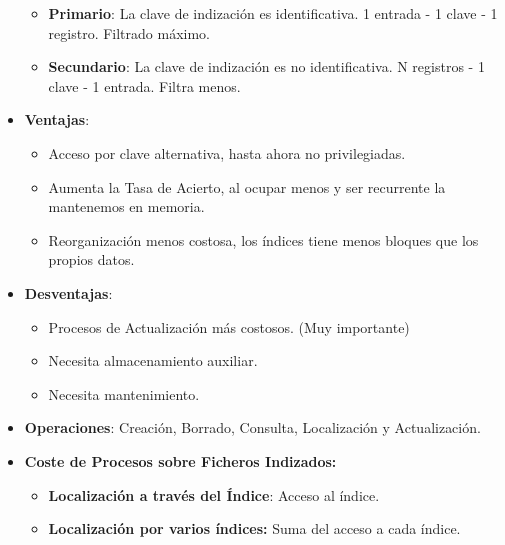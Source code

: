 \documentclass[12pt, twoside, openright]{report} %
\begin{document}
\begin{itemize}
    \begin{itemize}
    \item \textbf{Primario}: La clave de indización es identificativa. 
    1 entrada - 1 clave - 1 registro. Filtrado máximo.
      
    \item \textbf{Secundario}: La clave de indización es no identificativa.
      N registros - 1 clave - 1 entrada. Filtra menos.
      
    \end{itemize}
  \item \textbf{Ventajas}:
    

    \begin{itemize}
    \item Acceso por clave alternativa, hasta ahora no privilegiadas.
      
    \item Aumenta la Tasa de Acierto, al ocupar menos y ser recurrente la
      mantenemos en memoria.
      
    \item Reorganización menos costosa, los índices tiene menos bloques que
      los propios datos.
      
    \end{itemize}
	\pagebreak
  \item \textbf{Desventajas}:
    

    \begin{itemize}
    \item Procesos de Actualización más costosos. (Muy importante)
      
    \item Necesita almacenamiento auxiliar.
      
    \item Necesita mantenimiento.
      
    \end{itemize}
  \item \textbf{Operaciones}: Creación, Borrado, Consulta, Localización y
    Actualización.
    
  \item \textbf{Coste de Procesos sobre Ficheros Indizados:}
    

    \begin{itemize}
    \item \textbf{Localización a través del Índice}: Acceso al índice.
      
    \item \textbf{Localización por varios índices:} Suma del acceso a cada
      índice.
      

\end{itemize}
\end{itemize}
\end{document}
